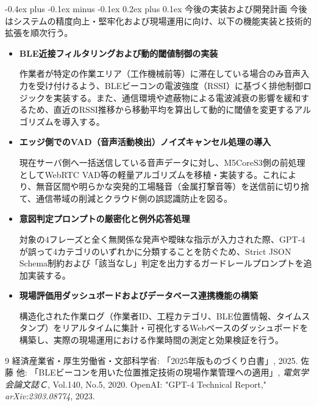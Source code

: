 \documentclass[a4paper,10pt,twocolumn,ja=standard,lualatex]{bxjsarticle}
\makeatletter
\renewcommand{\section}{\@startsection{section}{1}{\z@}%
  {-0.4ex plus -0.1ex minus -0.1ex}%
  {0.2ex plus 0.1ex}%
  {\normalfont\large\bfseries}}
\makeatother
\begin{document}
\section{今後の実装および開発計画}
今後はシステムの精度向上・堅牢化および現場運用に向け、以下の機能実装と技術的拡張を順次行う。

\begin{itemize}
    \item \textbf{BLE近接フィルタリングおよび動的閾値制御の実装}
    
    作業者が特定の作業エリア（工作機械前等）に滞在している場合のみ音声入力を受け付けるよう、BLEビーコンの電波強度（RSSI）に基づく排他制御ロジックを実装する。また、通信環境や遮蔽物による電波減衰の影響を緩和するため、直近のRSSI推移から移動平均を算出して動的に閾値を変更するアルゴリズムを導入する。
    
    \item \textbf{エッジ側でのVAD（音声活動検出）ノイズキャンセル処理の導入}
    
    現在サーバ側へ一括送信している音声データに対し、M5CoreS3側の前処理としてWebRTC VAD等の軽量アルゴリズムを移植・実装する。これにより、無音区間や明らかな突発的工場騒音（金属打撃音等）を送信前に切り捨て、通信帯域の削減とクラウド側の誤認識防止を図る。
        
    \item \textbf{意図判定プロンプトの厳密化と例外応答処理}
    
    対象の4フレーズと全く無関係な発声や曖昧な指示が入力された際、GPT-4が誤って4カテゴリのいずれかに分類することを防ぐため、Strict JSON Schema制約および「該当なし」判定を出力するガードレールプロンプトを追加実装する。

    \item \textbf{現場評価用ダッシュボードおよびデータベース連携機能の構築}
    
    構造化された作業ログ（作業者ID、工程カテゴリ、BLE位置情報、タイムスタンプ）をリアルタイムに集計・可視化するWebベースのダッシュボードを構築し、実際の現場運用における作業時間の測定と効果検証を行う。
\end{itemize}

\begin{thebibliography}{9}
\small
\setlength{\itemsep}{0pt}
\setlength{\parskip}{0pt}
経済産業省・厚生労働省・文部科学省: 「2025年版ものづくり白書」, 2025.
佐藤 他: 「BLEビーコンを用いた位置推定技術の現場作業管理への適用」, {\it 電気学会論文誌Ｃ}, Vol.140, No.5, 2020.
OpenAI: "GPT-4 Technical Report," {\it arXiv:2303.08774}, 2023.
\end{thebibliography}
\end{document}
